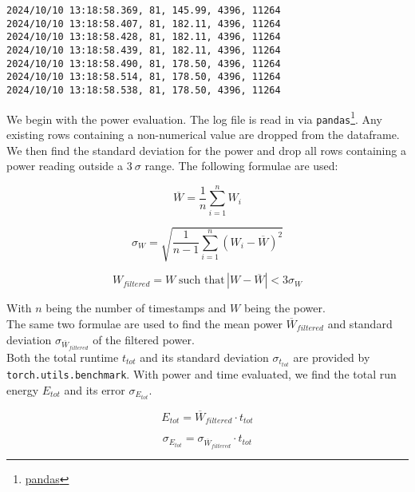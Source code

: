 \begin{verbatim}
2024/10/10 13:18:58.369, 81, 145.99, 4396, 11264
2024/10/10 13:18:58.407, 81, 182.11, 4396, 11264
2024/10/10 13:18:58.428, 81, 182.11, 4396, 11264
2024/10/10 13:18:58.439, 81, 182.11, 4396, 11264
2024/10/10 13:18:58.490, 81, 178.50, 4396, 11264
2024/10/10 13:18:58.514, 81, 178.50, 4396, 11264
2024/10/10 13:18:58.538, 81, 178.50, 4396, 11264
\end{verbatim}

We begin with the power evaluation. The log file is read in via \texttt{pandas}\footnote{\href{https://pandas.pydata.org/}{pandas}}. Any existing rows containing a non-numerical value are dropped from the dataframe. We then find the standard deviation for the power and drop all rows containing a power reading outside a $3 \: \sigma $ range. The following formulae are used:

\begin{equation}
\overline{W} = \frac{1}{n} \sum_{i=1}^{n} W_i
\end{equation}

\begin{equation}
\sigma_W = \sqrt{\frac{1}{n - 1} \sum_{i=1}^{n} (W_i - \overline{W})^2}
\end{equation}

\begin{equation}
W_{filtered} = W \; \text{such that} \, |W - \overline{W}| < 3 \sigma_W
\end{equation}
    
With \( n \) being the number of timestamps and \( W \) being the power. \\
The same two formulae are used to find the mean power \( \overline{W}_{filtered} \) and standard deviation \( \sigma_{\overline{W}_{filtered}} \) of the filtered power. \\
Both the total runtime \(t_{tot}\) and its standard deviation \(\sigma_{t_{tot}} \) are provided by \texttt{torch.utils.benchmark}.
With power and time evaluated, we find the total run energy \( E_{tot} \) and its error \( \sigma_{E_{tot}} \).

\begin{equation}
E_{tot} = \overline{W}_{filtered} \cdot t_{tot}
\end{equation}

\begin{equation}
\sigma_{E_{tot}} = \sigma_{\overline{W}_{filtered}} \cdot t_{tot}
\end{equation}

